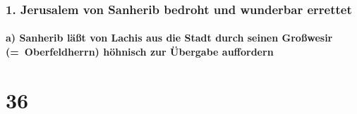\hypertarget{jerusalem-von-sanherib-bedroht-und-wunderbar-errettet}{%
\subsubsection{1. Jerusalem von Sanherib bedroht und wunderbar
errettet}\label{jerusalem-von-sanherib-bedroht-und-wunderbar-errettet}}

\hypertarget{a-sanherib-luxe4uxdft-von-lachis-aus-die-stadt-durch-seinen-grouxdfwesir-oberfeldherrn-huxf6hnisch-zur-uxfcbergabe-auffordern}{%
\paragraph{a) Sanherib läßt von Lachis aus die Stadt durch seinen
Großwesir (=~Oberfeldherrn) höhnisch zur Übergabe
auffordern}\label{a-sanherib-luxe4uxdft-von-lachis-aus-die-stadt-durch-seinen-grouxdfwesir-oberfeldherrn-huxf6hnisch-zur-uxfcbergabe-auffordern}}

\hypertarget{section-35}{%
\section{36}\label{section-35}}

